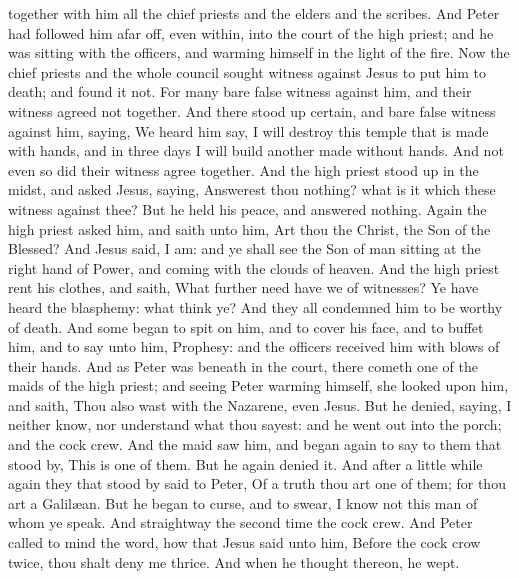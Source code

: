 together with him all the chief priests and the elders and the scribes. And Peter had followed him afar off, even within, into the court of the high priest; and he was sitting with the officers, and warming himself in the light of the fire. Now the chief priests and the whole council sought witness against Jesus to put him to death; and found it not. For many bare false witness against him, and their witness agreed not together. And there stood up certain, and bare false witness against him, saying, We heard him say, I will destroy this temple that is made with hands, and in three days I will build another made without hands. And not even so did their witness agree together. And the high priest stood up in the midst, and asked Jesus, saying, Answerest thou nothing? what is it which these witness against thee? But he held his peace, and answered nothing. Again the high priest asked him, and saith unto him, Art thou the Christ, the Son of the Blessed? And Jesus said, I am: and ye shall see the Son of man sitting at the right hand of Power, and coming with the clouds of heaven. And the high priest rent his clothes, and saith, What further need have we of witnesses? Ye have heard the blasphemy: what think ye? And they all condemned him to be worthy of death. And some began to spit on him, and to cover his face, and to buffet him, and to say unto him, Prophesy: and the officers received him with blows of their hands.  And as Peter was beneath in the court, there cometh one of the maids of the high priest; and seeing Peter warming himself, she looked upon him, and saith, Thou also wast with the Nazarene, even Jesus. But he denied, saying, I neither know, nor understand what thou sayest: and he went out into the porch; and the cock crew. And the maid saw him, and began again to say to them that stood by, This is one of them. But he again denied it. And after a little while again they that stood by said to Peter, Of a truth thou art one of them; for thou art a Galilæan. But he began to curse, and to swear, I know not this man of whom ye speak. And straightway the second time the cock crew. And Peter called to mind the word, how that Jesus said unto him, Before the cock crow twice, thou shalt deny me thrice. And when he thought thereon, he wept. 

